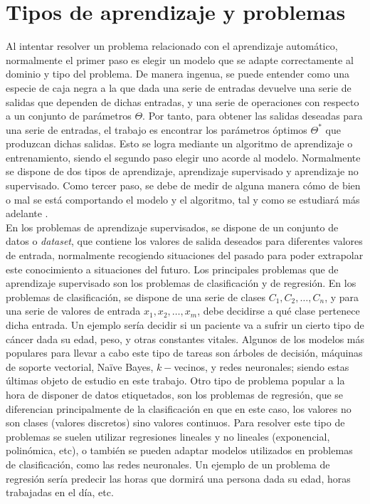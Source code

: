 	\section{Tipos de aprendizaje y problemas}
	
		Al intentar resolver un problema relacionado con el aprendizaje automático, normalmente el primer paso es elegir un modelo que se adapte correctamente al dominio y tipo del problema. De manera ingenua, se puede entender como una especie de caja negra a la que dada una serie de entradas devuelve una serie de salidas que dependen de dichas entradas, y una serie de operaciones con respecto a un conjunto de parámetros $\Theta$. Por tanto, para obtener las salidas deseadas para una serie de entradas, el trabajo es encontrar los parámetros óptimos $\Theta^*$ que produzcan dichas salidas. Esto se logra mediante un algoritmo de aprendizaje o entrenamiento, siendo el segundo paso elegir uno acorde al modelo. Normalmente se dispone de dos tipos de aprendizaje, aprendizaje supervisado y aprendizaje no supervisado. Como tercer paso, se debe de medir de alguna manera cómo de bien o mal se está comportando el modelo y el algoritmo, tal y como se estudiará más adelante \cite{Szeliski}. \\
		
		En los problemas de aprendizaje supervisados, se dispone de un conjunto de datos o \textit{dataset}, que contiene los valores de salida deseados para diferentes valores de entrada, normalmente recogiendo situaciones del pasado para poder extrapolar este conocimiento a situaciones del futuro. Los principales problemas que de aprendizaje supervisado son los problemas de clasificación y de regresión. En los problemas de clasificación, se dispone de una serie de clases $C_1, C_2, \hdots, C_n$, y para una serie de valores de entrada $x_1, x_2, \hdots, x_m$, debe decidirse a qué clase pertenece dicha entrada. Un ejemplo sería decidir si un paciente va a sufrir un cierto tipo de cáncer dada su edad, peso, y otras constantes vitales. Algunos de los modelos más populares para llevar a cabo este tipo de tareas son árboles de decisión, máquinas de soporte vectorial, Naïve Bayes, $k-$vecinos, y redes neuronales; siendo estas últimas objeto de estudio en este trabajo. Otro tipo de problema popular a la hora de disponer de datos etiquetados, son los problemas de regresión, que se diferencian principalmente de la clasificación en que en este caso, los valores no son clases (valores discretos) sino valores continuos. Para resolver este tipo de problemas se suelen utilizar regresiones lineales y no lineales (exponencial, polinómica, etc), o también se pueden adaptar modelos utilizados en problemas de clasificación, como las redes neuronales. Un ejemplo de un problema de regresión sería predecir las horas que dormirá una persona dada su edad, horas trabajadas en el día, etc. \\
		
